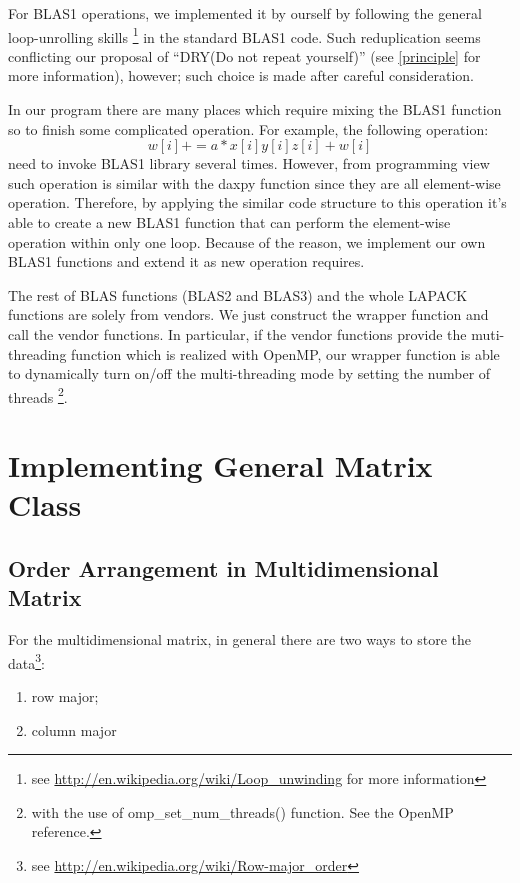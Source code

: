 For BLAS1 operations, we implemented it by ourself by following the general
loop-unrolling skills \footnote{see \url{http://en.wikipedia.org/wiki/Loop_unwinding}
for more information} in the standard BLAS1 code. Such reduplication seems
conflicting our proposal of ``DRY(Do not repeat yourself)'' (see \ref{principle}
for more information), however; such choice is made after careful consideration.

In our program there are many places which require mixing the BLAS1 function
so to finish some complicated operation. For example, the following operation:
\begin{equation}
 w[i] += a*x[i]y[i]z[i] + w[i]
\end{equation}
need to invoke BLAS1 library several times. However, from programming view 
such operation is similar with the daxpy function since they are all element-wise 
operation. Therefore, by applying the similar code structure to this operation
it's able to create a new BLAS1 function that can perform the element-wise 
operation within only one loop. Because of the reason, we implement our own
BLAS1 functions and extend it as new operation requires.

The rest of BLAS functions (BLAS2 and BLAS3) and the whole LAPACK functions
are solely from vendors. We just construct the wrapper function and call
the vendor functions. In particular, if the vendor functions provide the 
muti-threading function which is realized with OpenMP, our wrapper function
is able to dynamically turn on/off the multi-threading mode by setting 
the number of threads \footnote{with the use of omp\_set\_num\_threads()
function. See the OpenMP reference.}.

\section{Implementing General Matrix Class}

\subsection{Order Arrangement in Multidimensional Matrix}
%
%
For the multidimensional matrix, in general there are two ways 
to store the data\footnote{see 
 \url{http://en.wikipedia.org/wiki/Row-major_order}}:
\begin{enumerate}
 \item row major;
 \item column major
\end{enumerate}

